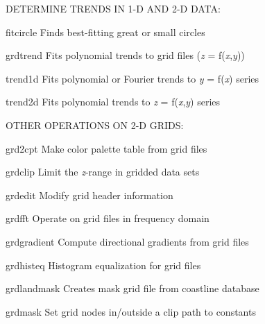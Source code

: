 \documentclass{article}
\begin{document}
\par DETERMINE TRENDS IN 1-D AND 2-D DATA:\par 

\par 	fitcircle	Finds best-fitting great or small circles\par 

\par 	grdtrend	Fits polynomial trends to grid files ({\it z} = f({\it x},{\it y}))\par 

\par 	trend1d	Fits polynomial or Fourier trends to {\it y} = f({\it x}) series\par 

\par 	trend2d	Fits polynomial trends to {\it z} = f({\it x},{\it y}) series\par 

\par \par 

\par OTHER OPERATIONS ON 2-D GRIDS:\par 

\par 	grd2cpt	Make color palette table from grid files\par 

\par 	grdclip	Limit the {\it z}-range in gridded data sets\par 

\par 	grdedit	Modify grid header information\par 

\par 	grdfft	Operate on grid files in frequency domain\par 

\par 	grdgradient	Compute directional gradients from grid files\par 

\par 	grdhisteq	Histogram equalization for grid files\par 

\par 	grdlandmask	Creates mask grid file from coastline database\par 

\par 	grdmask	Set grid nodes in/outside a clip path to constants\par 
\end{document}
